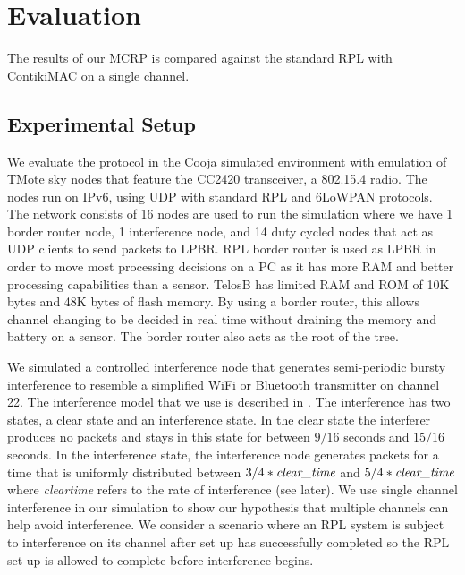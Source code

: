 \section{Evaluation}
\label{sec:evaluation}
The results of our MCRP is compared against the standard RPL with ContikiMAC on a single channel.

\subsection{Experimental Setup}
We evaluate the protocol in the  Cooja simulated environment with emulation of TMote sky nodes that feature the CC2420 transceiver, a 802.15.4 radio. The nodes run on IPv6, using UDP with standard RPL and 6LoWPAN protocols. The network consists of 16 nodes are used to run the simulation where we have 1 border router node, 1 interference node, and 14 duty cycled nodes that act as UDP clients to send packets to LPBR. RPL border router is used as LPBR in order to move most processing decisions on a PC as it has more RAM and better processing capabilities than a sensor. TelosB has limited RAM and ROM of 10K bytes and 48K bytes of flash memory. By using a border router, this allows channel changing to be decided in real time without draining the memory and battery on a sensor. The border router also acts as the root of the tree.

We simulated a controlled interference node that generates semi-periodic bursty interference to resemble a simplified WiFi or Bluetooth transmitter on channel 22. The interference model that we use is described in \cite{Boano:2010:MSM:2127940.2127963}. The interference has two states, a clear state and an interference state. In the clear state the interferer produces no packets and stays in this state for between $9/16$ seconds and $15/16$ seconds. In the interference state, the interference node generates packets for a time that is uniformly distributed between $3/4 * \emph{clear\textunderscore time}$ and $5/4 * \emph{clear\textunderscore time}$ where \emph{clear\textunderscore time} refers to the rate of interference (see later). We use single channel interference in our simulation to show our hypothesis that multiple channels can help avoid interference.  We consider a scenario where an RPL system is subject to interference on its channel after set up has successfully completed so the RPL set up is allowed to complete before
interference begins.



